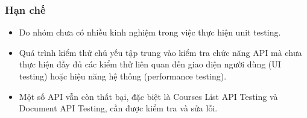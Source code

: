 \subsubsection{Hạn chế}
\begin{itemize}
    \item Do nhóm chưa có nhiều kinh nghiệm trong việc thực hiện unit testing.
    \item Quá trình kiểm thử chủ yếu tập trung vào kiểm tra chức năng API mà chưa thực hiện đầy đủ các kiểm thử liên quan đến giao diện người dùng (UI testing) hoặc hiệu năng hệ thống (performance testing). 
    \item Một số API vẫn còn thất bại, đặc biệt là Courses List API Testing và Document API Testing, cần được kiểm tra và sửa lỗi.
\end{itemize}
